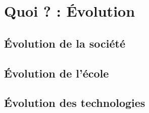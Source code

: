 
\chapter{Quoi ? : Évolution}\label{quoi}

\section{Évolution de la société}

\section{Évolution de l'école}

\section{Évolution des technologies}


